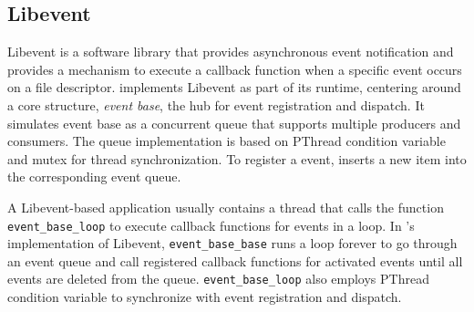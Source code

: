 \subsection{Libevent}
\label{sec:event}

Libevent is a software library that provides asynchronous event notification and provides a mechanism to execute a callback function when a specific event occurs on a file descriptor.
\lancet implements Libevent as part of its runtime, centering around a core structure, {\em event base}, the hub for event registration and dispatch.
It simulates event base as a concurrent queue that supports multiple producers and consumers.
The queue implementation is based on PThread condition variable and mutex for thread synchronization.
To register a event, \lancet inserts a new item into the corresponding event queue.

A Libevent-based application usually contains a thread that calls the function {\tt event\_base\_loop} to execute callback functions for events in a loop.
In \lancet's implementation of Libevent, {\tt event\_base\_base} runs a loop forever to go through an event queue and call registered callback functions for activated events until all events are deleted from the queue.
{\tt event\_base\_loop} also employs PThread condition variable to synchronize with event registration and dispatch.


